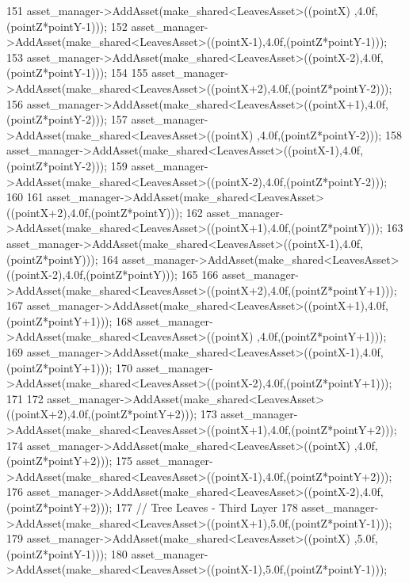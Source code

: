 \begin{DoxyCode}
151             asset\_manager->AddAsset(make\_shared<LeavesAsset>((pointX)  ,4.0f,(pointZ*pointY-1)));
152             asset\_manager->AddAsset(make\_shared<LeavesAsset>((pointX-1),4.0f,(pointZ*pointY-1)));
153             asset\_manager->AddAsset(make\_shared<LeavesAsset>((pointX-2),4.0f,(pointZ*pointY-1)));
154  
155             asset\_manager->AddAsset(make\_shared<LeavesAsset>((pointX+2),4.0f,(pointZ*pointY-2)));
156             asset\_manager->AddAsset(make\_shared<LeavesAsset>((pointX+1),4.0f,(pointZ*pointY-2)));
157             asset\_manager->AddAsset(make\_shared<LeavesAsset>((pointX)  ,4.0f,(pointZ*pointY-2)));
158             asset\_manager->AddAsset(make\_shared<LeavesAsset>((pointX-1),4.0f,(pointZ*pointY-2)));
159             asset\_manager->AddAsset(make\_shared<LeavesAsset>((pointX-2),4.0f,(pointZ*pointY-2)));
160  
161             asset\_manager->AddAsset(make\_shared<LeavesAsset>((pointX+2),4.0f,(pointZ*pointY)));
162             asset\_manager->AddAsset(make\_shared<LeavesAsset>((pointX+1),4.0f,(pointZ*pointY)));
163             asset\_manager->AddAsset(make\_shared<LeavesAsset>((pointX-1),4.0f,(pointZ*pointY)));
164             asset\_manager->AddAsset(make\_shared<LeavesAsset>((pointX-2),4.0f,(pointZ*pointY)));
165  
166             asset\_manager->AddAsset(make\_shared<LeavesAsset>((pointX+2),4.0f,(pointZ*pointY+1)));
167             asset\_manager->AddAsset(make\_shared<LeavesAsset>((pointX+1),4.0f,(pointZ*pointY+1)));
168             asset\_manager->AddAsset(make\_shared<LeavesAsset>((pointX)  ,4.0f,(pointZ*pointY+1)));
169             asset\_manager->AddAsset(make\_shared<LeavesAsset>((pointX-1),4.0f,(pointZ*pointY+1)));
170             asset\_manager->AddAsset(make\_shared<LeavesAsset>((pointX-2),4.0f,(pointZ*pointY+1)));
171 
172             asset\_manager->AddAsset(make\_shared<LeavesAsset>((pointX+2),4.0f,(pointZ*pointY+2)));
173             asset\_manager->AddAsset(make\_shared<LeavesAsset>((pointX+1),4.0f,(pointZ*pointY+2)));
174             asset\_manager->AddAsset(make\_shared<LeavesAsset>((pointX)  ,4.0f,(pointZ*pointY+2)));
175             asset\_manager->AddAsset(make\_shared<LeavesAsset>((pointX-1),4.0f,(pointZ*pointY+2)));
176             asset\_manager->AddAsset(make\_shared<LeavesAsset>((pointX-2),4.0f,(pointZ*pointY+2)));
177             \textcolor{comment}{// Tree Leaves - Third Layer}
178             asset\_manager->AddAsset(make\_shared<LeavesAsset>((pointX+1),5.0f,(pointZ*pointY-1)));
179             asset\_manager->AddAsset(make\_shared<LeavesAsset>((pointX)  ,5.0f,(pointZ*pointY-1)));
180             asset\_manager->AddAsset(make\_shared<LeavesAsset>((pointX-1),5.0f,(pointZ*pointY-1))); 

\end{DoxyCode}
